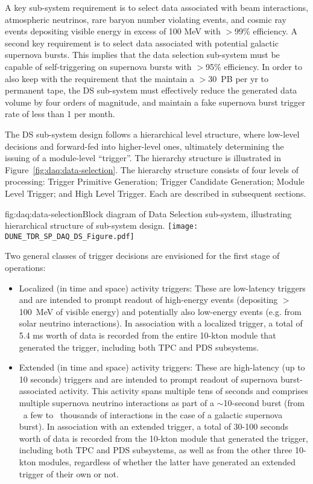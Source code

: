 A key sub-system requirement is to select data associated with beam
interactions, atmospheric neutrinos, rare baryon number violating events,
and cosmic ray events depositing visible energy in excess of 100 MeV
with $>$99\% efficiency. A second key requirement is to select data
associated with potential galactic supernova bursts. This implies that
the data selection sub-system must be capable of self-triggering on
supernova bursts with $>$95\% efficiency. In order to also keep with the
requirement that the   maintain a $>$30~PB per yr to permanent
tape, the DS sub-system must effectively reduce the generated data
volume by four orders of magnitude, and maintain a fake supernova
burst trigger rate of less than 1 per month.

The DS sub-system design follows a hierarchical level structure, where low-level
decisions and forward-fed into higher-level ones, ultimately
determining the issuing of a  module-level ``trigger''. The hierarchy
structure is illustrated in Figure~\ref{fig:daq:data-selection}. The hierarchy structure
consists of four levels of processing: Trigger Primitive Generation;
Trigger Candidate Generation; Module Level Trigger; and High Level
Trigger. Each are described in subsequent sections.

\begin{dunefigure}{fig:daq:data-selection}{Block diagram of  
    Data Selection sub-system, illustrating hierarchical structure of
    sub-system design.}
  \texttt{[image: DUNE\_TDR\_SP\_DAQ\_DS\_Figure.pdf]}
\end{dunefigure}

Two general classes of trigger decisions are envisioned for the first
stage of operations:
\begin{itemize}
 \item Localized (in time and space) activity triggers: These are
   low-latency triggers and are intended to prompt readout of
   high-energy events (depositing $>$100~MeV of visible energy) 
   and potentially also low-energy events
   (e.g. from solar neutrino interactions). In association with a
   localized trigger, a total of 5.4 ms worth of data is recorded from
   the entire 10-kton module that generated the trigger, including
   both TPC and PDS subsystems.   
\item Extended (in time and space) activity triggers: These are
  high-latency (up to 10 seconds) triggers and are intended to prompt readout of
  supernova burst-associated activity. This activity spans multiple
  tens of seconds and comprises multiple supernova neutrino
  interactions as part of a $\sim$10-second burst (from ~a few to
  ~thousands of interactions in the case of a galactic supernova
  burst). In association with an extended trigger, a total of 30-100
  seconds worth of data is recorded from the 10-kton module that
  generated the trigger, including both TPC and PDS subsystems, as
  well as from the other three 10-kton modules, regardless of whether
  the latter have generated an extended trigger of their own or not.  
\end{itemize}

